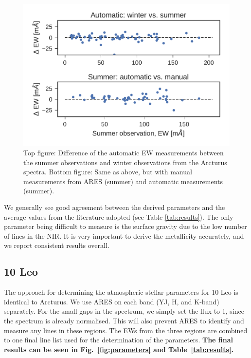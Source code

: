 \documentclass{aa}
\begin{document}
\begin{figure}[htpb!]
    \centering
    \includegraphics[width=1.0\linewidth]{figures/EWcomp.pdf}
    \caption{Top figure: Difference of the automatic EW measurements between the
             summer observations and winter observations from the Arcturus
             spectra. Bottom figure: Same as above, but with manual measurements
             from ARES (summer) and automatic measurements (summer).}
    \label{fig:EWcomp}
\end{figure}


We generally see good agreement between the derived parameters and the average
values from the literature adopted (see Table \ref{tab:results}). The only
parameter being difficult to measure is the surface gravity due to the low
number of  lines in the NIR. It is very important to derive the
metallicity accurately, and we report consistent results overall.


\subsection{10 Leo}
\label{sec:10Leo}

The approach for determining the atmospheric stellar parameters for 10 Leo is
identical to Arcturus. We use ARES on each band (YJ, H, and K-band) separately.
For the small gaps in the spectrum, we simply set the flux to 1, since the
spectrum is already normalised. This will also prevent ARES to identify and
measure any lines in these regions. The EWs from the three regions are combined
to one final line list used for the determination of the parameters. {\bf The
final results can be seen in Fig.~\ref{fig:parameters} and
Table~\ref{tab:results}.}
\end{document}
